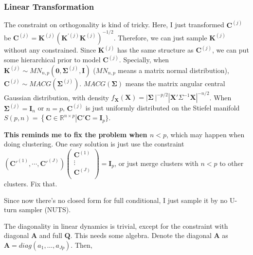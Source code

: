 \documentclass[]{article}
\begin{document}
\subsubsection{Linear Transformation}
The constraint on orthogonality is kind of tricky. Here, I just transformed \(\mathbf{C}^{(j)}\) be
\(\mathbf{C}^{(j)} = \mathbf{K}^{(j)}\left( \mathbf{K}^{'(j)}\mathbf{K}^{(j)} \right)^{- 1/2}\). Therefore,
we can just sample \(\mathbf{K}^{(j)}\) without any constrained. Since
\(\mathbf{K}^{(j)}\) has the same structure as \(\mathbf{C}^{(j)}\), we can put some
hierarchical prior to model \(\mathbf{C}^{(j)}\). Specially, when
\(\mathbf{K}^{(j)} \sim MN_{n,p}(\mathbf{0},\bm{\Sigma}^{(j)},\mathbf{I})\) (\(MN_{n,p}\) means a matrix
normal distribution), \(\mathbf{C}^{(j)} \sim MACG(\bm{\Sigma}^{(j)})\).
\(MACG(\bm{\Sigma})\) means the matrix angular central Gaussian distribution,
with density
\(f_{\mathbf{X}}(\mathbf{X}) = |\bm{\Sigma}\left. \  \right|^{- p/2}{|\mathbf{X}'\Sigma^{- 1}\mathbf{X}|}^{- n/2}\).
When \(\bm{\Sigma}^{(j)} = \mathbf{I}_{n}\) or \(n = p\), \(\mathbf{C}^{(j)}\) is just
uniformly distributed on the Stiefel manifold
\(S(p,n) = \left\{ \mathbf{C} \in \mathbb{R}^{n \times p} \right|\mathbf{C}'\mathbf{C} = \mathbf{I}_{p}\}\).

\textbf{This reminds me to fix the problem when \(n < p\)}, which may happen when doing clustering. One easy solution is just use the constraint
\( (\mathbf{C}'^{(1)},\cdots, \mathbf{C}'^{(J)})
\begin{pmatrix}
	\mathbf{C}^{(1)} \\
	\vdots \\
	\mathbf{C}^{(J)} \\
\end{pmatrix} = \mathbf{I}_{p}\), or just merge clusters with \(n < p\) to other
clusters. Fix that.

Since now there's no closed form for full conditional, I just sample it by no U-turn sampler (NUTS).

The diagonality in linear dynamics is trivial, except for the constraint with diagonal \(\mathbf{A}\) and full \(\mathbf{Q}\). This needs some algebra. Denote the diagonal \(\mathbf{A}\) as \(\mathbf{A} = diag(a_{1},\ldots,a_{Jp})\). Then,
\end{document}
